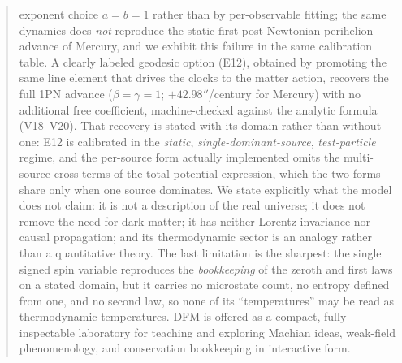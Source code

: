 \documentclass[aps,reprint,amsmath,amssymb,nofootinbib,superscriptaddress,floatfix]{revtex4-2}
\begin{document}
\begin{abstract}
exponent choice $a = b = 1$ rather than by per-observable fitting; the
same dynamics does \emph{not} reproduce the static first
post-Newtonian perihelion advance of Mercury, and we exhibit this
failure in the same calibration table.
A clearly labeled geodesic option (E12), obtained by promoting the
same line element that drives the clocks to the matter action,
recovers the full 1PN advance ($\beta = \gamma = 1$; $+42.98''$/century
for Mercury) with no additional free coefficient, machine-checked
against the analytic formula (V18--V20).
That recovery is stated with its domain rather than without one: E12 is
calibrated in the \emph{static}, \emph{single-dominant-source},
\emph{test-particle} regime, and the per-source form actually
implemented omits the multi-source cross terms of the total-potential
expression, which the two forms share only when one source dominates.
We state explicitly what the model does not claim: it is not a
description of the real universe; it does not remove the need for dark
matter; it has neither Lorentz invariance nor causal propagation; and
its thermodynamic sector is an analogy rather than a quantitative
theory.
The last limitation is the sharpest: the single signed spin variable
reproduces the \emph{bookkeeping} of the zeroth and first laws on a
stated domain, but it carries no microstate count, no entropy defined
from one, and no second law, so none of its ``temperatures'' may be
read as thermodynamic temperatures.
DFM is offered as a compact, fully inspectable laboratory for teaching
and exploring Machian ideas, weak-field phenomenology, and conservation
bookkeeping in interactive form.
\end{abstract}

\maketitle
\end{document}
